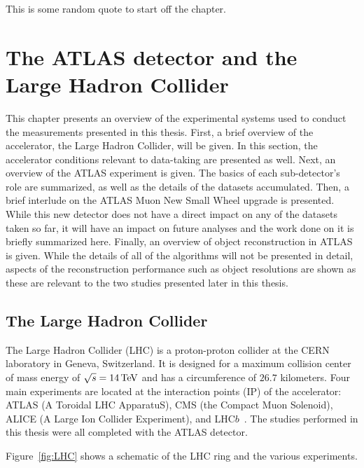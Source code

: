 \begin{savequote}[75mm]
This is some random quote to start off the chapter.
\end{savequote}

\chapter{The ATLAS detector and the Large Hadron Collider}

This chapter presents an overview of the experimental systems used to conduct the measurements presented in this thesis. First, a brief overview of the accelerator, the Large Hadron Collider, will be given. In this section, the accelerator conditions relevant to data-taking are presented as well. Next, an overview of the ATLAS experiment is given. The basics of each sub-detector's role are summarized, as well as the details of the datasets accumulated. Then, a brief interlude on the ATLAS Muon New Small Wheel upgrade is presented. While this new detector does not have a direct impact on any of the datasets taken so far, it will have an impact on future analyses and the work done on it is briefly summarized here. Finally, an overview of object reconstruction in ATLAS is given. While the details of all of the algorithms will not be presented in detail, aspects of the reconstruction performance such as object resolutions are shown as these are relevant to the two studies presented later in this thesis. 

\section{The Large Hadron Collider}

The Large Hadron Collider (LHC) is a proton-proton collider at the CERN laboratory in Geneva, Switzerland\cite{LHCPaper}. It is designed for a maximum collision center of mass energy of $\sqrt{s} = 14 \TeV$ and has a circumference of $26.7$ kilometers. Four main experiments are located at the interaction points (IP) of the accelerator: ATLAS (A Toroidal LHC ApparatuS), CMS (the Compact Muon Solenoid), ALICE (A Large Ion Collider Experiment), and LHC$b$~\cite{ATLASPaper, CMSPaper, LHCbPaper, ALICEPaper}. The studies performed in this thesis were all completed with the ATLAS detector.

Figure~\ref{fig:LHC} shows a schematic of the LHC ring and the various experiments.  

